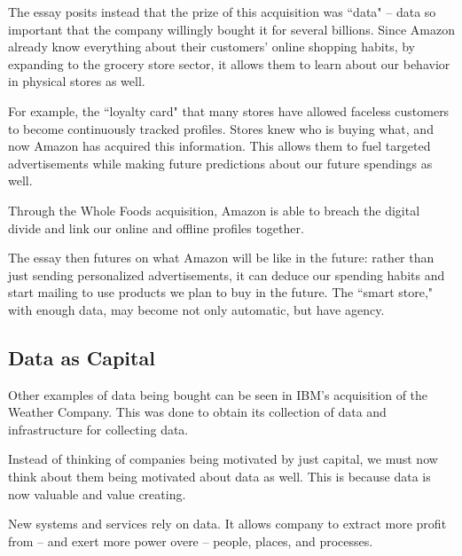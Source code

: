 \documentclass[openany]{book}
\begin{document}
The essay posits instead that the prize of this acquisition was ``data" -- data so important that the company willingly bought it for several billions. Since Amazon already know everything about their customers' online shopping habits, by expanding to the grocery store sector, it allows them to learn about our behavior in physical stores as well.

For example, the ``loyalty card" that many stores have allowed faceless customers to become continuously tracked profiles. Stores knew who is buying what, and now Amazon has acquired this information. This allows them to fuel targeted advertisements while making future predictions about our future spendings as well.

Through the Whole Foods acquisition, Amazon is able to breach the digital divide and link our online and offline profiles together.

The essay then futures on what Amazon will be like in the future: rather than just sending personalized advertisements, it can deduce our spending habits and start mailing to use products we plan to buy in the future. The ``smart store," with enough data, may become not only automatic, but have agency.

\subsection{Data as Capital}
Other examples of data being bought can be seen in IBM's acquisition of the Weather Company. This was done to obtain its collection of data and infrastructure for collecting data.

Instead of thinking of companies being motivated by just capital, we must now think about them being motivated about data as well. This is because data is now valuable and value creating.

New systems and services rely on data. It allows company to extract more profit from -- and exert more power overe -- people, places, and processes.
\end{document}

